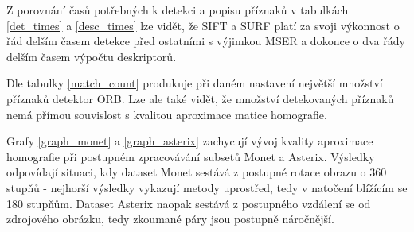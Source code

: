 Z porovnání časů potřebných k detekci a popisu příznaků v tabulkách \ref{det_times} a \ref{desc_times} lze vidět, že SIFT a SURF platí za svoji
výkonnost o řád delším časem detekce před ostatními s výjimkou MSER a dokonce o dva řády delším časem výpočtu deskriptorů.

Dle tabulky \ref{match_count} produkuje při daném nastavení největší množství příznaků detektor ORB. Lze ale také vidět, že množství
detekovaných příznaků nemá přímou souvislost s kvalitou aproximace matice homografie.

Grafy \ref{graph_monet} a \ref{graph_asterix} zachycují vývoj kvality aproximace homografie při postupném zpracovávání subsetů Monet a Asterix.
Výsledky odpovídají situaci, kdy dataset Monet sestává z postupné rotace obrazu o 360 stupňů - nejhorší výsledky vykazují metody uprostřed, tedy
v natočení blížícím se 180 stupňům. Dataset Asterix naopak sestává z postupného vzdálení se od zdrojového obrázku, tedy zkoumané páry jsou postupně
náročnější.








%


